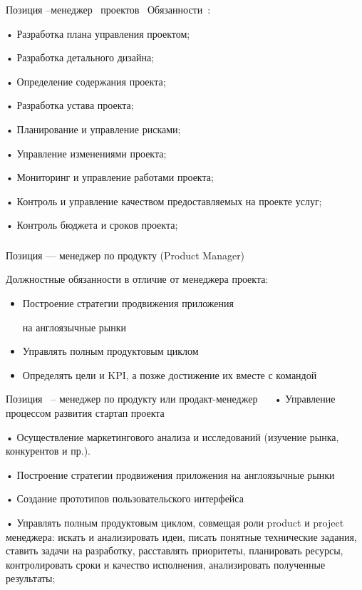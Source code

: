 \documentclass{../industrial-development}
\begin{document}
\lecturenotes

Позиция –менеджер~\cite{hh} проектов~\cite{itcf}
Обязанности~\cite{rab}:

• Разработка плана управления проектом;

• Разработка детального дизайна;

• Определение содержания проекта;

• Разработка устава проекта;

• Планирование и управление рисками;

• Управление изменениями проекта;

• Мониторинг и управление работами проекта;

• Контроль и управление качеством предоставляемых на проекте услуг;

• Контроль бюджета и сроков проекта;



\begin{frame} \frametitle{}
 \begin{block}{}
  \alert{Позиция --- менеджер по продукту (Product Manager)}

Должностные обязанности в отличие от менеджера проекта: 
  \end{block}
  \begin{itemize}
  \item Построение стратегии продвижения приложения 

на англоязычные рынки
  \item Управлять полным продуктовым циклом
 \item Определять цели и KPI, а позже достижение их вместе с командой
  \end{itemize}
\end{frame}

\lecturenotes

Позиция~\cite{hh} – менеджер по продукту или продакт-менеджер ~\cite{itcf}~\cite{rab}
•	Управление процессом развития стартап проекта 

•	Осуществление маркетингового анализа и исследований (изучение рынка, конкурентов и пр.).

•	Построение стратегии продвижения приложения на англоязычные рынки

•	Создание прототипов пользовательского интерфейса 

•	Управлять полным продуктовым циклом, совмещая роли product и project менеджера: искать и анализировать идеи, писать понятные технические задания, ставить задачи на разработку, расставлять приоритеты, планировать ресурсы, контролировать сроки и качество исполнения, анализировать полученные результаты;
\end{document}
